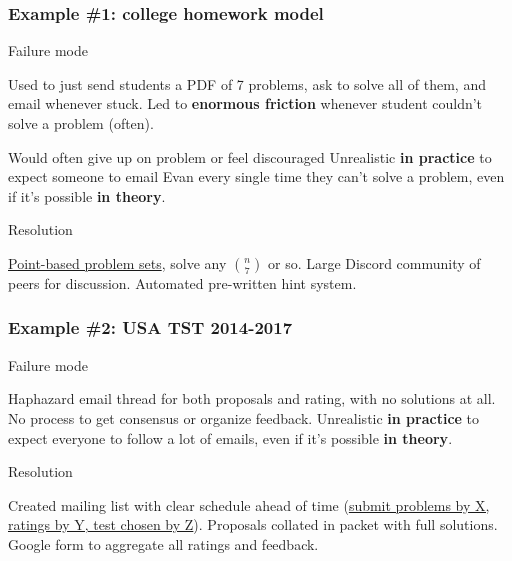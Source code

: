 \documentclass[10pt]{beamer}
\begin{document}
\begin{frame}
  \frametitle{Example \#1: college homework model}
  \begin{alertblock}{Failure mode}
    \begin{itemize}
      \ii Used to just send students a PDF of 7 problems,
      ask to solve all of them, and email whenever stuck.
      \ii Led to \textbf{enormous friction}
      whenever student couldn't solve a problem (often).
      \begin{itemize}
        \ii Would often give up on problem or feel discouraged
        \ii Unrealistic \textbf{in practice}
        to expect someone to email Evan every single time
        they can't solve a problem,
        even if it's possible \textbf{in theory}.
      \end{itemize}
    \end{itemize}
  \end{alertblock}
  \pause
  \begin{exampleblock}{Resolution}
    \begin{itemize}
      \ii \href{https://blog.evanchen.cc/points/}{Point-based problem sets},
      solve any $\binom n7$ or so.
      \ii Large Discord community of peers for discussion.
      \ii Automated pre-written hint system.
    \end{itemize}
  \end{exampleblock}
\end{frame}

\begin{frame}
  \frametitle{Example \#2: USA TST 2014-2017}
  \begin{alertblock}{Failure mode}
    \begin{itemize}
      \ii Haphazard email thread for both proposals and rating,
      with no solutions at all.
      \ii No process to get consensus or organize feedback.
      \ii Unrealistic \textbf{in practice} to expect
      everyone to follow a lot of emails,
      even if it's possible \textbf{in theory}.
    \end{itemize}
  \end{alertblock}
  \pause
  \begin{exampleblock}{Resolution}
    \begin{itemize}
      \ii Created mailing list with clear schedule ahead of time
      (\href{https://blog.evanchen.cc/usemo-dev/}{submit problems
      by X, ratings by Y, test chosen by Z}).
      \ii Proposals collated in packet with full solutions.
      \ii Google form to aggregate all ratings and feedback.
    \end{itemize}
  \end{exampleblock}
\end{frame}
\end{document}
